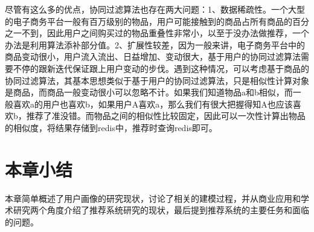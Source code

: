 		尽管有这么多的优点，协同过滤算法也存在两大问题：1、数据稀疏性。一个大型的电子商务平台一般有百万级别的物品，用户可能接触到的商品占所有商品的百分之一不到，因此用户之间购买过的物品重叠性非常小，以至于没办法做推荐，一个办法是利用算法添补部分值\citep{recmd-slopone}。2、扩展性较差，因为一般来讲，电子商务平台中的商品变动很小，用户流入流出、日益增加、变动很大，基于用户的协同过滤算法需要不停的跟新迭代保证跟上用户变动的步伐。遇到这种情况，可以考虑基于商品的协同过滤算法，其基本思想类似于基于用户的协同过滤算法，只是相似性计算对象是商品，而商品一般变动很小可以忽略不计。如果我们知道物品a和b相似，而一般喜欢a的用户也喜欢b，如果用户A喜欢a，那么我们有很大把握得知A也应该喜欢b，推荐了准没错。而物品之间的相似性比较固定，因此可以一次性计算出物品的相似度，将结果存储到redis中，推荐时查询redis即可。

	\section{本章小结}
	本章简单概述了用户画像的研究现状，讨论了相关的建模过程，并从商业应用和学术研究两个角度介绍了推荐系统研究的现状，最后提到推荐系统的主要任务和面临的问题。